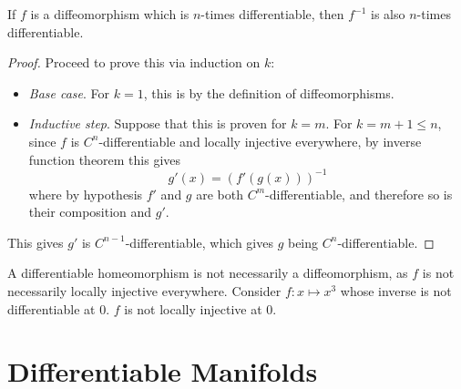 \documentclass{article}
\begin{document}
\begin{proposition}
    If $f$ is a diffeomorphism which is $n$-times differentiable, then $f^{-1}$ is also $n$-times differentiable.
\end{proposition}

\begin{proof}
    Proceed to prove this via induction on $k$:
    \begin{itemize}
        \item \emph{Base case}. For $k = 1$, this is by the definition of diffeomorphisms.
        \item \emph{Inductive step}. Suppose that this is proven for $k = m$. For $k = m+1 \leq n$, since $f$ is $C^n$-differentiable and locally injective everywhere, by inverse function theorem this gives
        \[
            g'(x) = (f'(g(x)))^{-1}
        \]
        where by hypothesis $f'$ and $g$ are both $C^m$-differentiable, and therefore so is their composition and $g'$.
    \end{itemize}
    This gives $g'$ is $C^{n-1}$-differentiable, which gives $g$ being $C^n$-differentiable.
\end{proof}

\begin{remark}
    A differentiable homeomorphism is not necessarily a diffeomorphism, as $f$ is not necessarily locally injective everywhere. Consider $f: x \mapsto x^3$ whose inverse is not differentiable at $0$. $f$ is not locally injective at 0.  
\end{remark}

\section{Differentiable Manifolds}
\end{document}
